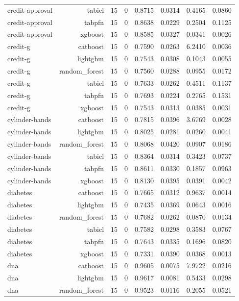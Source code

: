 \begin{table}[htbp]
\begin{tabular}{lrrrrrrr}
credit-approval & tabicl & 15 & 0 & 0.8715 & 0.0314 & 0.4165 & 0.0860 \\
credit-approval & tabpfn & 15 & 0 & 0.8638 & 0.0229 & 0.2504 & 0.1125 \\
credit-approval & xgboost & 15 & 0 & 0.8585 & 0.0327 & 0.0341 & 0.0026 \\
credit-g & catboost & 15 & 0 & 0.7590 & 0.0263 & 6.2410 & 0.0036 \\
credit-g & lightgbm & 15 & 0 & 0.7543 & 0.0308 & 0.1043 & 0.0055 \\
credit-g & random\_forest & 15 & 0 & 0.7560 & 0.0288 & 0.0955 & 0.0172 \\
credit-g & tabicl & 15 & 0 & 0.7633 & 0.0262 & 0.4511 & 0.1137 \\
credit-g & tabpfn & 15 & 0 & 0.7693 & 0.0224 & 0.2765 & 0.1531 \\
credit-g & xgboost & 15 & 0 & 0.7543 & 0.0313 & 0.0385 & 0.0031 \\
cylinder-bands & catboost & 15 & 0 & 0.7815 & 0.0396 & 3.6769 & 0.0028 \\
cylinder-bands & lightgbm & 15 & 0 & 0.8025 & 0.0281 & 0.0260 & 0.0041 \\
cylinder-bands & random\_forest & 15 & 0 & 0.8068 & 0.0420 & 0.0907 & 0.0186 \\
cylinder-bands & tabicl & 15 & 0 & 0.8364 & 0.0314 & 0.3423 & 0.0737 \\
cylinder-bands & tabpfn & 15 & 0 & 0.8611 & 0.0330 & 0.1857 & 0.0963 \\
cylinder-bands & xgboost & 15 & 0 & 0.8130 & 0.0395 & 0.0391 & 0.0042 \\
diabetes & catboost & 15 & 0 & 0.7665 & 0.0312 & 0.9637 & 0.0014 \\
diabetes & lightgbm & 15 & 0 & 0.7435 & 0.0369 & 0.0643 & 0.0016 \\
diabetes & random\_forest & 15 & 0 & 0.7682 & 0.0262 & 0.0870 & 0.0134 \\
diabetes & tabicl & 15 & 0 & 0.7582 & 0.0298 & 0.3583 & 0.0767 \\
diabetes & tabpfn & 15 & 0 & 0.7643 & 0.0335 & 0.1696 & 0.0820 \\
diabetes & xgboost & 15 & 0 & 0.7331 & 0.0390 & 0.0368 & 0.0013 \\
dna & catboost & 15 & 0 & 0.9605 & 0.0075 & 7.9722 & 0.0216 \\
dna & lightgbm & 15 & 0 & 0.9617 & 0.0081 & 0.5433 & 0.0298 \\
dna & random\_forest & 15 & 0 & 0.9523 & 0.0116 & 0.2055 & 0.0521 \\

\end{tabular}
\end{table}
